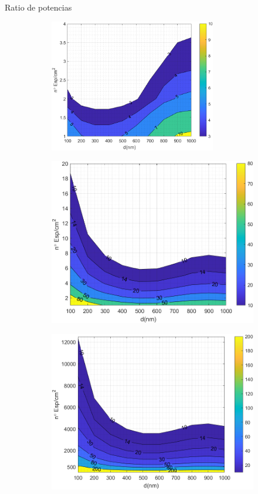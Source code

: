 \documentclass[spanish,a4paper]{beamer}%
\newcommand{\resRelPath}{\graphicspath{{./figuras/Resultados/RelacionCondRad/}}}
\begin{document}
		\begin{frame}{Ratio de potencias}
			\resRelPath
			\vspace{-5pt}
			\begin{figure}[h]%
				\centering
				\begin{subfigure}[b]{0.48\textwidth}\centering
					\includegraphics[width=0.8\textwidth]{SS}%
				\end{subfigure}\hfill
				\begin{subfigure}[b]{0.48\textwidth}\centering
					\includegraphics[width=.8\textwidth]{SS_Rc_empirico}%
				\end{subfigure}\hfill
				\begin{subfigure}[b]{0.48\textwidth}\centering
					\includegraphics[width=.8\textwidth]{SS_Rc_Intermedio}%

\end{subfigure}
\end{figure}
\end{frame}
\end{document}
